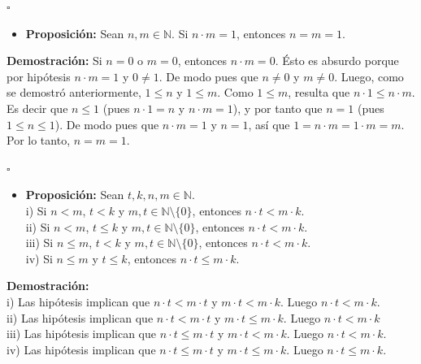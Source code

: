 \documentclass[10 pt]{article}
\begin{document}
\begin{flushright}
    $\square$
\end{flushright}

\begin{itemize}
    \item \Large{\textbf{Proposición:} Sean $n,m \in \mathbb N$. Si $n \cdot m=1$, entonces $n=m=1$.} \\
\end{itemize}

\Large{\textbf{Demostración:} Si $n=0$ o $m=0$, entonces $n \cdot m=0$. Ésto es absurdo porque por hipótesis $n \cdot m=1$ y $0 \neq 1$. De modo pues que $n \neq 0$ y $m \neq 0$. Luego, como se demostró anteriormente, $1 \leq n$ y $1 \leq m$. Como $1 \leq m$, resulta que $n \cdot 1 \leq n \cdot m$. Es decir que $n \leq 1$ (pues $n \cdot 1=n$ y $n \cdot m=1$), y por tanto que $n=1$ (pues $1 \leq n \leq 1$). De modo pues que $n \cdot m=1$ y $n=1$, así que $1=n \cdot m=1 \cdot m=m$. Por lo tanto, $n=m=1$.} \\

\begin{flushright}
    $\square$
\end{flushright}

\begin{itemize}
    \item \Large{\textbf{Proposición:} Sean $t,k,n,m \in \mathbb N$. \\

    i) Si $n<m$, $t<k$ y $m,t \in \mathbb N \setminus \{0\}$, entonces $n \cdot t<m \cdot k$. \\

    ii) Si $n<m$, $t \leq k$ y $m,t \in \mathbb N \setminus \{0\}$, entonces $n \cdot t<m \cdot k$. \\

    iii) Si $n \leq m$, $t<k$ y $m,t \in \mathbb N \setminus \{0\}$, entonces $n \cdot t<m \cdot k$. \\

    iv) Si $n \leq m$ y $t \leq k$, entonces $n \cdot t \leq m \cdot k$.}\\
\end{itemize}

\Large{\textbf{Demostración:} \\

i) Las hipótesis implican que $n \cdot t<m \cdot t$ y $m \cdot t<m \cdot k$. Luego $n \cdot t<m \cdot k$. \\

ii) Las hipótesis implican que $n \cdot t<m \cdot t$ y $m \cdot t \leq m \cdot k$. Luego $n \cdot t < m \cdot k$ \\

iii) Las hipótesis implican que $n \cdot t \leq m \cdot t$ y $m \cdot t<m \cdot k$. Luego $n \cdot t<m \cdot k$. \\

iv) Las hipótesis implican que $n \cdot t \leq m \cdot t$ y $m \cdot t \leq m \cdot k$. Luego $n \cdot t \leq m \cdot k$.} \\
\end{document}
